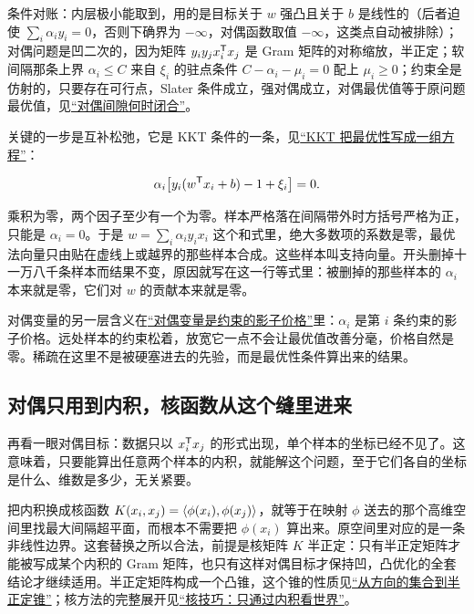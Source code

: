 条件对账：内层极小能取到，用的是目标关于 \(w\) 强凸且关于 \(b\) 是线性的（后者迫使 \(\sum_i\alpha_iy_i=0\)，否则下确界为 \(-\infty\)，对偶函数取值 \(-\infty\)，这类点自动被排除）；对偶问题是凹二次的，因为矩阵 \(y_iy_jx_i^{\mathsf{T}}x_j\) 是 Gram 矩阵的对称缩放，半正定；软间隔那条上界 \(\alpha_i\le C\) 来自 \(\xi_i\) 的驻点条件 \(C-\alpha_i-\mu_i=0\) 配上 \(\mu_i\ge0\)；约束全是仿射的，只要存在可行点，Slater 条件成立，强对偶成立，对偶最优值等于原问题最优值，见\hyperref[sec:09-Convex-Optimization/05-Duality/02]{``对偶间隙何时闭合''}。

关键的一步是互补松弛，它是 KKT 条件的一条，见\hyperref[sec:09-Convex-Optimization/05-Duality/03]{``KKT 把最优性写成一组方程''}：

\[
\alpha_i\bigl[y_i(w^{\mathsf{T}}x_i+b)-1+\xi_i\bigr]=0 .
\]

乘积为零，两个因子至少有一个为零。样本严格落在间隔带外时方括号严格为正，只能是 \(\alpha_i=0\)。于是 \(w=\sum_i\alpha_iy_ix_i\) 这个和式里，绝大多数项的系数是零，最优法向量只由贴在虚线上或越界的那些样本合成。这些样本叫支持向量。开头删掉十一万八千条样本而结果不变，原因就写在这一行等式里：被删掉的那些样本的 \(\alpha_i\) 本来就是零，它们对 \(w\) 的贡献本来就是零。

对偶变量的另一层含义在\hyperref[sec:09-Convex-Optimization/05-Duality/04]{``对偶变量是约束的影子价格''}里：\(\alpha_i\) 是第 \(i\) 条约束的影子价格。远处样本的约束松着，放宽它一点不会让最优值改善分毫，价格自然是零。稀疏在这里不是被硬塞进去的先验，而是最优性条件算出来的结果。

\subsection{对偶只用到内积，核函数从这个缝里进来}

再看一眼对偶目标：数据只以 \(x_i^{\mathsf{T}}x_j\) 的形式出现，单个样本的坐标已经不见了。这意味着，只要能算出任意两个样本的内积，就能解这个问题，至于它们各自的坐标是什么、维数是多少，无关紧要。

把内积换成核函数 \(K(x_i,x_j)=\left\langle\phi(x_i),\phi(x_j)\right\rangle\)，就等于在映射 \(\phi\) 送去的那个高维空间里找最大间隔超平面，而根本不需要把 \(\phi(x_i)\) 算出来。原空间里对应的是一条非线性边界。这套替换之所以合法，前提是核矩阵 \(K\) 半正定：只有半正定矩阵才能被写成某个内积的 Gram 矩阵，也只有这样对偶目标才保持凹，凸优化的全套结论才继续适用。半正定矩阵构成一个凸锥，这个锥的性质见\hyperref[sec:09-Convex-Optimization/02-Convex-Sets/03]{``从方向的集合到半正定锥''}；核方法的完整展开见\hyperref[sec:13-Machine-Learning/09-Kernel-Methods-and-Gaussian-Processes/02]{``核技巧：只通过内积看世界''}。

